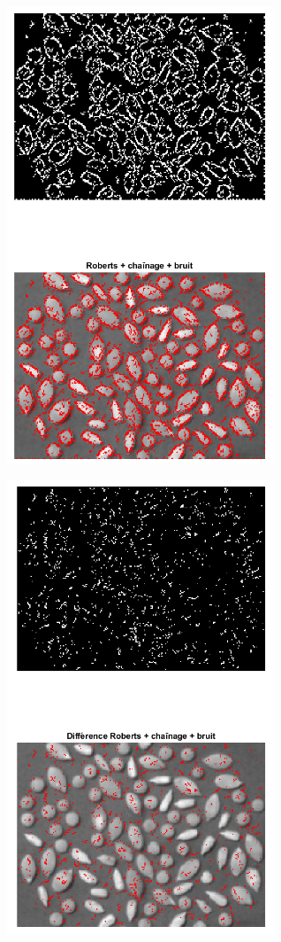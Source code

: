 \documentclass{article}
\begin{document}
\begin{itemize}[leftmargin=*]
\begin{itemize}[leftmargin=*]
\begin{minipage}[c]{0.46\linewidth}		
	\includegraphics[width=8cm]{Roberts_link_noise20.png}
\end{minipage}\hfill
\begin{minipage}[c]{0.46\linewidth}
	\includegraphics[width=8cm]{Diff_Roberts_link_noise20.png}
\end{minipage}\hfill
	

\end{itemize}
\end{itemize}
\end{document}
